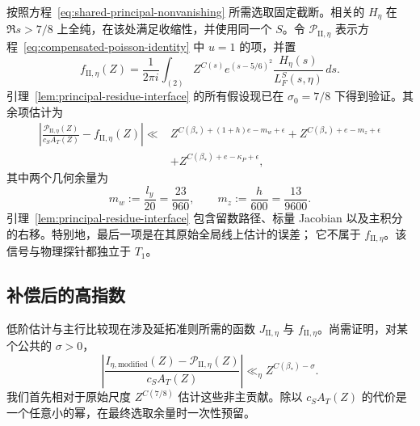 按照方程~\eqref{eq:shared-principal-nonvanishing} 所需选取固定截断。相关的
\(H_\eta\) 在 \(\Re s>7/8\) 上全纯，在该处满足收缩性，并使用同一个
\(S\)。令 \(\mathscr P_{\mathrm{II},\eta}\) 表示方程~\eqref{eq:compensated-poisson-identity}
中 \(u=1\) 的项，并置
\[
 f_{\mathrm{II},\eta}(Z)=\frac1{2\pi i}\int_{(2)}
 Z^{C(s)}e^{(s-5/6)^2}\frac{H_\eta(s)}{L_F^S(s,\eta)}\,ds.
\]
引理~\ref{lem:principal-residue-interface} 的所有假设现已在 \(\sigma_0=7/8\)
下得到验证。其余项估计为
\[
 \begin{split}
 \left|\frac{\mathscr P_{\mathrm{II},\eta}(Z)}{c_S A_T(Z)}
       -f_{\mathrm{II},\eta}(Z)\right|
 \ll{}&
 Z^{C(\beta_*)+(1+h)e-m_w+\epsilon}
 +Z^{C(\beta_*)+e-m_z+\epsilon}\\
 &+Z^{C(\beta_*)+e-\kappa_P+\epsilon},
 \end{split}
\]
其中两个几何余量为
\begin{equation}\label{old-eq:5.14}
 m_w:=\frac{l_y}{20}=\frac{23}{960},\qquad
 m_z:=\frac h{600}=\frac{13}{9600}.
\end{equation}
引理~\ref{lem:principal-residue-interface} 包含留数路径、标量 Jacobian
以及主积分的右移。特别地，最后一项是在其原始全局线上估计的误差；
它不属于 \(f_{\mathrm{II},\eta}\)。该信号与物理探针都独立于 \(T_1\)。

\subsection{补偿后的高指数}

低阶估计与主行比较现在涉及延拓准则所需的函数
$J_{\mathrm{II},\eta}$ 与 $f_{\mathrm{II},\eta}$。尚需证明，对某个公共的
$\sigma>0$，
\[
 \left|\frac{I_{\eta,\mathrm{modified}}(Z)
                -\mathscr P_{\mathrm{II},\eta}(Z)}{c_S A_T(Z)}\right|
 \ll_\eta Z^{C(\beta_*)-\sigma}.
\]
我们首先相对于原始尺度 $Z^{C(7/8)}$ 估计这些非主贡献。除以
$c_S A_T(Z)$ 的代价是一个任意小的幂，在最终选取余量时一次性预留。


